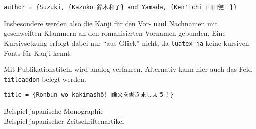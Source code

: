 \documentclass{japuzk}
\begin{document}
\begin{verbatim}
author = {Suzuki, {Kazuko 鈴木和子} and Yamada, {Ken'ichi 山田健一}}
\end{verbatim}

Insbesondere werden also die Kanji für den Vor- \textbf{und} Nachnamen mit geschweiften Klammern an den romanisierten Vornamen gebunden. Eine Kursivsetzung erfolgt dabei nur \enquote{aus Glück} nicht, da \texttt{luatex-ja} keine kursiven Fonts für Kanji kennt.

Mit Publikationstiteln wird analog verfahren. Alternativ kann hier auch das Feld \texttt{titleaddon} belegt werden.

\begin{verbatim}
title = {Ronbun wo kakimashô! 論文を書きましょう！}
\end{verbatim}

\begin{description}
	\item[Beispiel japanische Monographie] 
	\item[Beispiel japanischer Zeitschriftenartikel] 
\end{description}

\printbibliography[heading=bibintoc]
\end{document}
